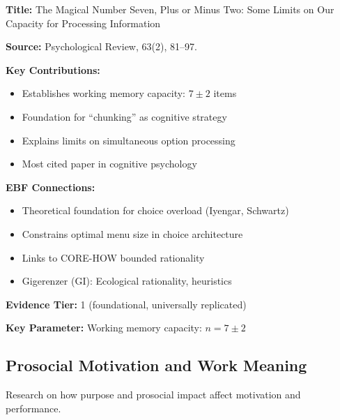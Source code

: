 \begin{tcolorbox}[colback=yellow!5!white,colframe=yellow!75!black,title=Key Paper: Miller (1956)]
\textbf{Title:} The Magical Number Seven, Plus or Minus Two: Some Limits on Our Capacity for Processing Information

\textbf{Source:} Psychological Review, 63(2), 81--97.

\textbf{Key Contributions:}
\begin{itemize}
    \item Establishes working memory capacity: $7 \pm 2$ items
    \item Foundation for ``chunking'' as cognitive strategy
    \item Explains limits on simultaneous option processing
    \item Most cited paper in cognitive psychology
\end{itemize}

\textbf{EBF Connections:}
\begin{itemize}
    \item Theoretical foundation for choice overload (Iyengar, Schwartz)
    \item Constrains optimal menu size in choice architecture
    \item Links to CORE-HOW bounded rationality
    \item Gigerenzer (GI): Ecological rationality, heuristics
\end{itemize}

\textbf{Evidence Tier:} 1 (foundational, universally replicated)

\textbf{Key Parameter:} Working memory capacity: $n = 7 \pm 2$
\end{tcolorbox}

\subsection{Prosocial Motivation and Work Meaning}
\label{subsec:ot-prosocial}

Research on how purpose and prosocial impact affect motivation and performance.

